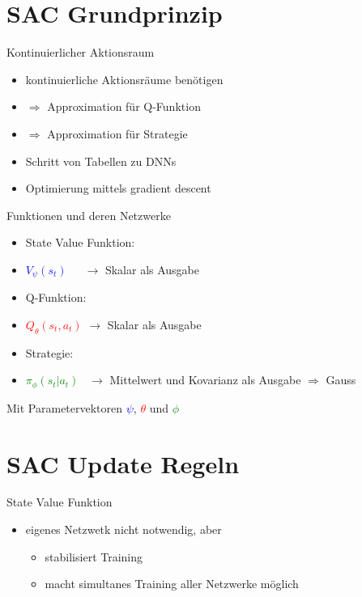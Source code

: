 \section{SAC Grundprinzip}

\begin{frame}{Kontinuierlicher Aktionsraum}
\begin{itemize}
\item kontinuierliche Aktionsräume benötigen
\item[] $\Rightarrow$ Approximation für Q-Funktion
\item[] $\Rightarrow$ Approximation für Strategie \\[12pt]
\item Schritt von Tabellen zu DNNs
\item Optimierung mittels gradient descent
\end{itemize}
\end{frame}

\begin{frame}{Funktionen und deren Netzwerke}
\begin{itemize}
\item State Value Funktion:
\item[] \textcolor{blue}{$V_{\psi}(s_{t})$} \,\,\,\,\,		$\rightarrow$ Skalar als Ausgabe \\[6pt]
\item Q-Funktion:
\item[] \textcolor{red}{$Q_{\theta}(s_{t},a_{t})$}		$\rightarrow$ Skalar als Ausgabe \\[6pt]
\item Strategie:
\item[] \textcolor{green}{$\pi_{\phi}(s_{t}|a_{t})$} \,	$\rightarrow$ Mittelwert und Kovarianz als Ausgabe $\Rightarrow$ Gauss \\[12pt]
\end{itemize}
Mit Parametervektoren \textcolor{blue}{$\psi$}, \textcolor{red}{$\theta$} und \textcolor{green}{$\phi$}
\end{frame}

\section{SAC Update Regeln}

\begin{frame}{State Value Funktion}
\begin{itemize}
\item eigenes Netzwetk nicht notwendig, aber
\begin{itemize}
\item stabilisiert Training
\item macht simultanes Training aller Netzwerke möglich
\end{itemize}
\end{itemize}
\end{frame}


